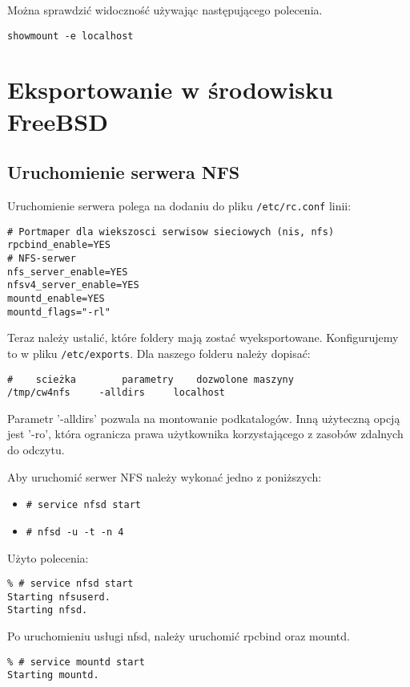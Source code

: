 \documentclass[a4paper,11pt]{article}
\begin{document}
Można sprawdzić widoczność używając następującego polecenia.

\begin{verbatim}
showmount -e localhost
\end{verbatim}


\section{Eksportowanie w środowisku FreeBSD}





\subsection{Uruchomienie serwera NFS}
Uruchomienie serwera polega na dodaniu do pliku \texttt{/etc/rc.conf} linii:

\footnotesize\begin{verbatim}
# Portmaper dla wiekszosci serwisow sieciowych (nis, nfs)
rpcbind_enable=YES		       
# NFS-serwer
nfs_server_enable=YES	    
nfsv4_server_enable=YES        
mountd_enable=YES		        
mountd_flags="-rl"		       
\end{verbatim}\normalsize

Teraz należy ustalić, które foldery mają zostać wyeksportowane. Konfigurujemy to w pliku \texttt{/etc/exports}. Dla naszego folderu należy dopisać:
\footnotesize\begin{verbatim}
#    scieżka        parametry    dozwolone maszyny
/tmp/cw4nfs     -alldirs     localhost
\end{verbatim}\normalsize
Parametr '-alldirs' pozwala na montowanie podkatalogów. Inną użyteczną opcją jest '-ro', która ogranicza prawa użytkownika korzystającego z zasobów zdalnych do odczytu.


Aby uruchomić serwer NFS należy wykonać jedno z poniższych:
\begin{itemize}
	\item \texttt{\# service nfsd start}
	\item \texttt{\# nfsd -u -t -n 4}
\end{itemize}


Użyto polecenia:
\footnotesize\begin{verbatim}
% # service nfsd start
Starting nfsuserd.
Starting nfsd.
\end{verbatim}\normalsize

Po uruchomieniu usługi nfsd, należy uruchomić rpcbind oraz mountd.
\footnotesize\begin{verbatim}
% # service mountd start
Starting mountd.
\end{verbatim}\normalsize
\end{document}
